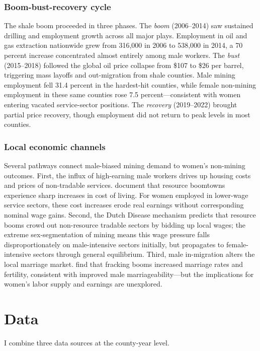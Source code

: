 \documentclass[12pt]{article}
\begin{document}
\subsubsection*{Boom-bust-recovery cycle} The shale boom proceeded in three phases. The \textit{boom} (2006--2014) saw sustained drilling and employment growth across all major plays. Employment in oil and gas extraction nationwide grew from 316,000 in 2006 to 538,000 in 2014, a 70 percent increase concentrated almost entirely among male workers. The \textit{bust} (2015--2018) followed the global oil price collapse from \$107 to \$26 per barrel, triggering mass layoffs and out-migration from shale counties. Male mining employment fell 31.4 percent in the hardest-hit counties, while female non-mining employment in these same counties rose 7.5 percent---consistent with women entering vacated service-sector positions. The \textit{recovery} (2019--2022) brought partial price recovery, though employment did not return to peak levels in most counties.

\subsubsection*{Local economic channels} Several pathways connect male-biased mining demand to women's non-mining outcomes. First, the influx of high-earning male workers drives up housing costs and prices of non-tradable services. \citet{Jacobsen2007} document that resource boomtowns experience sharp increases in cost of living. For women employed in lower-wage service sectors, these cost increases erode real earnings without corresponding nominal wage gains. Second, the Dutch Disease mechanism \citep{Corden1984} predicts that resource booms crowd out non-resource tradable sectors by bidding up local wages; the extreme sex-segmentation of mining means this wage pressure falls disproportionately on male-intensive sectors initially, but propagates to female-intensive sectors through general equilibrium. Third, male in-migration alters the local marriage market. \citet{Kearney2018} find that fracking booms increased marriage rates and fertility, consistent with improved male marriageability---but the implications for women's labor supply and earnings are unexplored.

\section{Data}

I combine three data sources at the county-year level.
\end{document}
